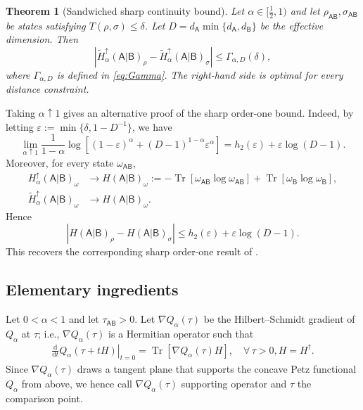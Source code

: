 \documentclass[11pt,reqno]{amsart}
\newtheorem{theorem}{Theorem}[section]
\theoremstyle{definition}
\DeclareMathOperator{\Tr}{Tr}
\newcommand{\A}{\mathsf{A}}
\newcommand{\B}{\mathsf{B}}
\newcommand{\dd}{\mathrm d}
\newcommand{\abs}[1]{\left\lvert#1\right\rvert}
\newcommand{\sand}{\widetilde}
\begin{document}
\begin{theorem}[Sandwiched sharp continuity bound]\label{thm:sand_main}
	Let $\alpha\in[\frac12,1)$ and let $\rho_{\A\B},\sigma_{\A\B}$ be states
	satisfying $T(\rho,\sigma)\leq\delta$.
	Let
	$D=d_{\A}\min\{d_{\A},d_{\B}\}$ be the effective dimension.  Then
	\begin{equation}\label{eq:sand_main-bound-piecewise}
		\boxed{\;\;
			\abs{\sand H_\alpha^\uparrow(\A|\B)_\rho
				-\sand H_\alpha^\uparrow(\A|\B)_\sigma}
			\leq
			\Gamma_{\alpha,D}(\delta),
            \;\;}
	\end{equation}
    where $\Gamma_{\alpha,D}$ is defined in \cref{eq:Gamma}.
	The right-hand side is optimal for every distance constraint.%
\end{theorem}


Taking $\alpha\uparrow1$ gives an alternative proof of the sharp order-one
bound.  Indeed, by letting $\varepsilon:=\min\{\delta,1-D^{-1}\}$, we have
\begin{equation}\label{eq:order-one-limit}
	\lim_{\alpha\uparrow1}
 \frac1{1-\alpha}
 \log\!\left[(1-\varepsilon)^\alpha
 +(D-1)^{1-\alpha}\varepsilon^\alpha\right]
 =h_2(\varepsilon)+\varepsilon\log(D-1).
\end{equation}
Moreover, for every state $\omega_{\A\B}$,
\begin{align}
    H_\alpha^\uparrow(\A|\B)_\omega
    &\to H(\A|\B)_{\omega} := - \Tr[ \omega_{\A\B} \log \omega_{\A\B}] + \Tr[ \omega_{\B} \log \omega_{\B}],
    \\
    \sand H_\alpha^\uparrow(\A|\B)_\omega
    &\to H(\A|\B)_{\omega}.
\end{align}
Hence
\begin{equation}\label{eq:order-one-bound}
	\abs{H(\A|\B)_\rho-H(\A|\B)_\sigma}
	\leq
	h_2(\varepsilon)+\varepsilon\log(D-1).
\end{equation}
This recovers the corresponding sharp order-one result of
\cite{BertaEtAl2026}.

\subsection{Elementary ingredients}

Let $0<\alpha<1$ and let $\tau_{\A\B}>0$. 
Let $\nabla Q_{\alpha}(\tau)$ be the Hilbert--Schmidt gradient of $Q_\alpha$ at $\tau$; i.e., $\nabla Q_{\alpha}(\tau)$ is a Hermitian operator such that 
\begin{align}\label{eq:general-gradient}
	\left.\frac{\dd}{\dd t} Q_{\alpha}(\tau + t H)\right|_{t=0}
	= \Tr\left[ \nabla Q_{\alpha}(\tau) H \right],
	\quad	\forall\, \tau>0, H=H^\dagger.
\end{align}
Since $\nabla Q_{\alpha}(\tau)$ draws a tangent plane that supports the concave Petz functional $Q_{\alpha}$ from above, we hence call $\nabla Q_{\alpha}(\tau)$ supporting operator and $\tau$ the comparison point.
\end{document}
